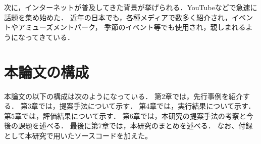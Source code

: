次に，インターネットが普及してきた背景が挙げられる．YouTubeなどで急速に話題を集め始めた．
近年の日本でも，各種メディアで数多く紹介され，イベントやアミューズメントパーク，
季節のイベント等でも使用され，親しまれるようになってきている\cite{tppm}．


\section{本論文の構成}
本論文の以下の構成は次のようになっている．
第2章では，先行事例を紹介する．
第3章では，提案手法について示す．
第4章では，実行結果について示す．
第5章では，評価結果について示す．
第6章では，本研究の提案手法の考察と今後の課題を述べる．
最後に第7章では，本研究のまとめを述べる．
なお、付録として本研究で用いたソースコードを加えた。
